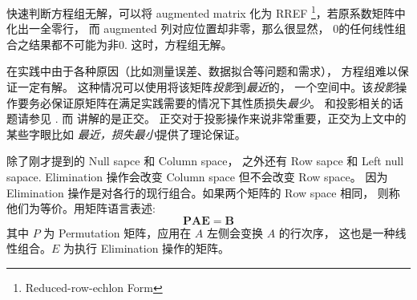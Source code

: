 快速判断方程组无解，可以将 augmented matrix 化为 RREF
\footnote{Reduced-row-echlon Form}，若原系数矩阵中化出一全零行，
而 augmented 列对应位置却非零，那么很显然，
0的任何线性组合之结果都不可能为非0.
这时，方程组无解。

在实践中由于各种原因（比如测量误差、数据拟合等问题和需求），
方程组难以保证一定有解。
这种情况可以使用将该矩阵\emph{投影}到\emph{最近}的，
一个空间中。该\emph{投影}操作要务必保证原矩阵在满足实践需要的情况下其性质损失\emph{最少}。
和投影相关的话题请参见
\cite[Chapter 4.2]{strang}. 而 \cite[Chapter 4]{strang} 讲解的是正交。
正交对于投影操作来说非常重要，正交为上文中的某些字眼比如
\emph{最近，损失最小}提供了理论保证。

除了刚才提到的 Null sapce 和 Column space，
之外还有 Row sapce 和 Left null sapace.
Elimination 操作会改变 Column space 但不会改变 Row space。
因为 Elimination 操作是对各行的现行组合。如果两个矩阵的 Row space 相同，
则称他们为等价。用矩阵语言表述:
\[
    \mathbf{PAE} = \mathbf{B}
\]
其中 $P$ 为 Permutation 矩阵，应用在 $A$ 左侧会变换 $A$ 的行次序，
这也是一种线性组合。$E$ 为执行 Elimination 操作的矩阵。

